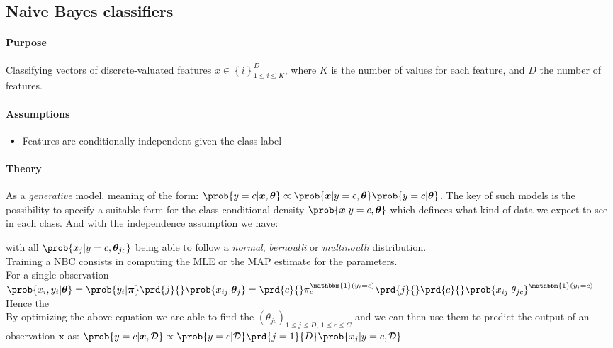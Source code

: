 \subsection{Naive Bayes classifiers}
\paragraph{Purpose}
Classifying vectors of discrete-valuated features $x\in\left\{i\right\}_{1\leq i \leq K}^{D}$, where $K$ is the number 
of values for each feature, and $D$ the number of features.

\paragraph{Assumptions}
\begin{itemize}
    \item Features are conditionally independent given the class label
\end{itemize}

\paragraph{Theory}
As a \emph{generative} model, meaning of the form:
$\prob{y=c|\bm{x}, \bm{\theta}} \propto \prob{\bm{x}|y=c,\bm{\theta}}
\prob{y=c|\bm{\theta}}$. The key of such models is the possibility
to specify a suitable form for the class-conditional density 
$\prob{\bm{x}|y=c, \bm{\theta}}$ which definees what kind of data we 
expect to see in each class. And with the independence assumption we 
have:
\begin{center}
\end{center}
with all $\prob{x_{j}|y=c,\bm{\theta}_{jc}}$ being able to 
follow a \textit{normal}, \textit{bernoulli} or \textit{multinoulli} 
distribution.\\
Training a NBC consists in computing the MLE or the MAP estimate for the
parameters.\\
For a single observation
$\prob{x_{i}, y_{i}|\bm{\theta}} = \prob{y_{i}|\bm{\pi}}\prd{j}{}\prob{x_{ij}|\bm{\theta}_{j}} = 
\prd{c}{}\pi_{c}^{\mathbbm{1}(y_{i}=c)}\prd{j}{}\prd{c}{}\prob{x_{ij}|
\theta_{jc}}^{\mathbbm{1}(y_{i}=c)}
$\\ 
Hence the \\
By optimizing the above equation we are able to find the $\left(\theta_{jc}\right)_{1\leq j \leq D,~ 1\leq c\leq C}$ and we can then use them to
predict the output of an observation $\bm{x}$ as: $\prob{y=c|\bm{x},\mathcal{D}} \propto \prob{y=c|\mathcal{D}}\prd{j=1}{D}\prob{x_{j}|y=c,\mathcal{D}}$

